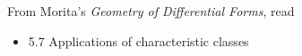 \documentclass{homework}
\author{Jim Fowler}
\date{Week 14: Applications}
\begin{document}
\maketitle

From Morita's \textit{Geometry of Differential Forms}, read
\begin{itemize}
\item 5.7 Applications of characteristic classes
\end{itemize}
\end{document}
